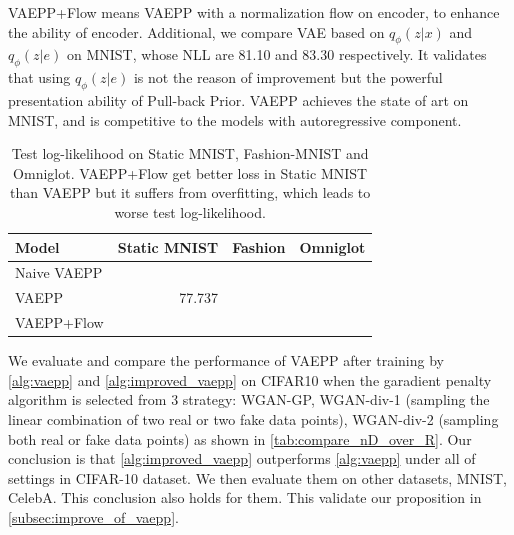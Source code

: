 \begin{table}[tb]
{%
VAEPP+Flow means VAEPP with a normalization flow on encoder, to enhance the ability of encoder. 
Additional, we compare VAE based on $q_\phi(z|x)$ and $q_\phi(z|e)$ on MNIST, whose NLL are 81.10 and 83.30 respectively. It validates that using $q_\phi(z|e)$ is not the reason of improvement but the powerful presentation ability of Pull-back Prior. VAEPP achieves the state of art on MNIST, and is competitive to the models with autoregressive component. }
\label{tab:mnist-nll}
\end{table}
\begin{table}[tb]
\centering
\begin{tabular}{lrrr}  
\toprule
Model   & Static MNIST & Fashion & Omniglot \\
\midrule
Naive VAEPP    &      &    &    \\
VAEPP          &   77.737   &    &     \\
VAEPP+Flow     &      &    &     \\
\bottomrule
\end{tabular}
\caption{Test log-likelihood on Static MNIST, Fashion-MNIST and Omniglot. VAEPP+Flow get better loss in Static MNIST than VAEPP but it suffers from overfitting, which leads to worse test log-likelihood. }
\label{tab:cifar-nll}
\end{table}
We evaluate and compare the performance of VAEPP after training by \cref{alg:vaepp} and \cref{alg:improved_vaepp} on CIFAR10 when the garadient penalty algorithm is selected from 3 strategy: WGAN-GP, WGAN-div-1  (sampling the linear combination of two real or two fake data points), WGAN-div-2 (sampling both real or fake data points) as shown in \cref{tab:compare_nD_over_R}. Our conclusion is that \cref{alg:improved_vaepp} outperforms \cref{alg:vaepp} under all of settings in CIFAR-10 dataset. We then evaluate them on other datasets, MNIST, CelebA. This conclusion also holds for them. This validate our proposition in \cref{subsec:improve_of_vaepp}. 
